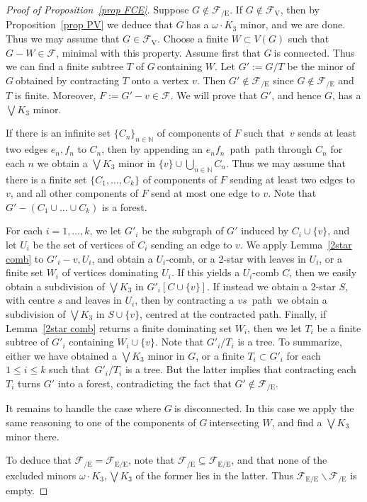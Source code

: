 \documentclass{article}
\newcommand{\frs}{\mathcal{F}}
\newcommand{\frsV}{\frs_\mathrm{V}}
\newcommand{\frsCE}{\frs_\mathrm{{/E}}}
\newcommand{\rmece}[1]{\ensuremath{#1_{\mathrm{E/E}}}}
\newcommand{\omdot}{\omega \cdot}
\newcommand{\N}{\ensuremath{\mathbb N}}
\newcommand{\sm}{\backslash}
\newcommand{\nin}{\ensuremath{{n\in\N}}}
\newcommand{\pth}[2]{\ensuremath{#1}\text{--}\ensuremath{#2}~path}
\newcommand{\g}{\ensuremath{G\ }}
\newcommand{\G}{\ensuremath{G}}
\newcommand{\Lr}[1]{Lemma~\ref{#1}}
\newcommand{\Prr}[1]{Pro\-position~\ref{#1}}
\newcommand{\fea}{for each}
\newcommand{\st}{such that}
\begin{document}
\begin{proof}[Proof of \Prr{prop FCE}]
Suppose $G\not\in \frsCE$. 
If $G\not\in \frsV$, then by \Prr{prop PV} we deduce that \g has a $\omdot K_3$ minor, and we are done. Thus we may assume that $G\in \frsV$. Choose a finite $W\subset V(G)$ \st\ $G-W\in \frs$, minimal with this property. Assume first that \g is connected. Thus we can find a finite subtree  $T$ of \g containing $W$. Let $G':= G/T$ be the minor of \g obtained by contracting $T$ onto a vertex $v$. Then $G'\not\in \frsCE$ since $G\not\in \frsCE$ and $T$ is finite. Moreover, $F:= G'-v\in \frs$. We will prove that $G'$, and hence \G, has a $\bigvee K_3$ minor.

If there is an infinite set $\{C_n\}_{\nin}$ of components of $F$ \st\ $v$ sends at least two edges $e_n,f_n$ to $C_n$, then by appending an \pth{e_n}{f_n}\ path through $C_n$ for each $n$ we obtain a $\bigvee K_3$ minor in $\{v\} \cup \bigcup_{\nin} C_n$. Thus we may assume that there is a finite set $\{C_1, \ldots, C_k\}$ of components of $F$ sending at least two edges to $v$, and all other components of $F$ send at most one edge to $v$. Note that $G'-(C_1 \cup \ldots \cup C_k)$ is a forest.  

For each $i=1,\ldots, k$, we let $G'_i$ be the subgraph of $G'$ induced by $C_i \cup \{v\}$, and let $U_i$ be the set of vertices of $C_i$ sending an edge to $v$. We apply \Lr{2star comb} to $G'_i-v,U_i$, and obtain a $U_i$-comb, or a 2-star with leaves in $U_i$, or a finite set $W_i$ of vertices dominating $U_i$. If this yields a $U_i$-comb $C$, then we easily obtain a subdivision of $\bigvee K_3$ in $G'_i[C \cup \{v\}]$. If instead we obtain a 2-star $S$, with centre $s$ and leaves in $U_i$, then by contracting a \pth{v}{s}\ we obtain a subdivision of $\bigvee K_3$ in $S \cup \{v\}$, centred at the contracted path. Finally, if \Lr{2star comb} returns a finite dominating set $W_i$, then we let $T_i$ be a finite subtree of $G'_i$ containing  $W_i \cup \{v\}$. Note that $G'_i/T_i$ is a tree. To summarize, either we have obtained a $\bigvee K_3$ minor in \G, or a finite $T_i\subset G'_i$ \fea\ $1\leq i \leq k$ \st\ $G'_i/T_i$ is a tree. But the latter implies that contracting each $T_i$ turns $G'$ into a forest, contradicting the fact that $G'\not\in \frsCE$.

It remains to handle the case where \g is disconnected. In this case we apply the same reasoning to one of the components of \g intersecting $W$, and find a $\bigvee K_3$ minor there.

\medskip
To deduce that $\frsCE= \rmece{\frs}$, note that $\frsCE \subseteq \rmece{\frs}$, and that none of the excluded minors $\omdot K_3,  \bigvee K_3$ of the former lies in the latter. Thus $\rmece{\frs} \sm \frsCE$ is empty.
\end{proof}
\end{document}
